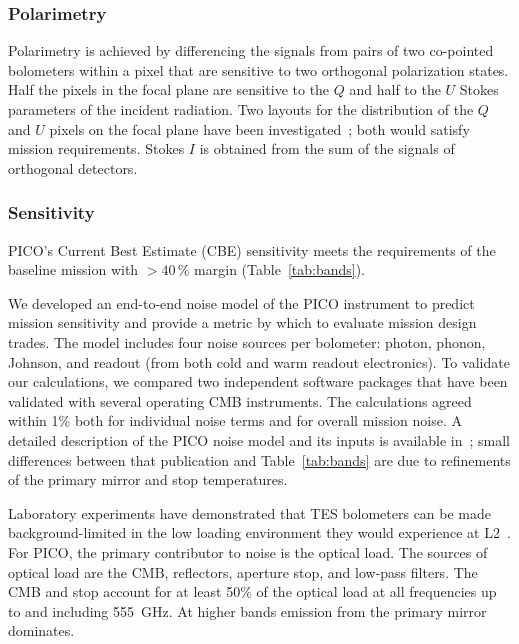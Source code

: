 

\subsubsection{Polarimetry}
\label{sec:polarimetry} %

Polarimetry is achieved by differencing the signals from pairs of two co-pointed bolometers within a pixel that are sensitive to two orthogonal polarization states. Half the pixels in the focal plane are sensitive to the $Q$ and half to the $U$ Stokes parameters of the incident radiation. Two layouts for the distribution of the $Q$ and $U$ pixels on the focal plane have been investigated~\citep{picoweb_QU}; both would satisfy mission requirements. Stokes $I$ is obtained from the sum of the signals of orthogonal detectors.  

\subsubsection{Sensitivity}
\label{sec:sensitivity} %

PICO's Current Best Estimate (CBE) sensitivity meets the requirements of the baseline mission with \hbox{$>40\,\%$} margin (Table~\ref{tab:bands}).

We developed an end-to-end noise model of the PICO instrument to predict mission sensitivity and provide a metric by which to evaluate mission design trades. The model includes four noise sources per bolometer: photon, phonon, Johnson, and readout (from both cold and warm readout electronics). To validate our calculations, we compared two independent software packages that have been validated with several operating CMB instruments. The calculations agreed within 1\% both for individual noise terms and for overall mission noise. A detailed description of the PICO noise model and its inputs is available in~\citet{Young2018}; small differences between that publication and Table~\ref{tab:bands} are due to refinements of the primary mirror and stop temperatures.

Laboratory experiments have demonstrated that TES bolometers can be made background-limited in the low loading environment they would experience at L2~\citep{Beyer2012}. For PICO, the primary contributor to noise is the optical load. The sources of optical load are the CMB, reflectors, aperture stop, and low-pass filters. The CMB and stop account for at least 50\% of the optical load at all frequencies up to and including 555~GHz. At higher bands emission from the primary mirror dominates.


